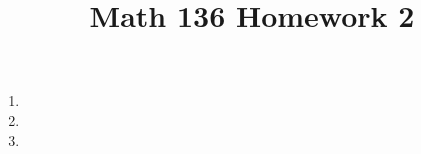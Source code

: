 \documentclass{article}
\title{Math 136 Homework 2}
\begin{document}
\maketitle
\begin{enumerate}
	\item 
	\item 
	\item 
\end{enumerate}
\end{document}
